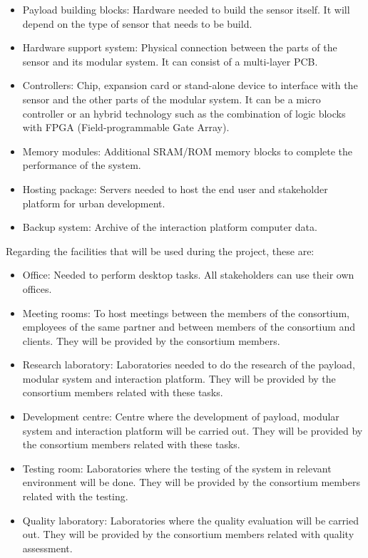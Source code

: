 \begin{itemize}
\item Payload building blocks: Hardware needed to build the sensor itself. It will depend on the type of sensor that needs to be build.
\item Hardware support system: Physical connection between the parts of the sensor and its modular system. It can consist of a multi-layer PCB.
\item Controllers: Chip, expansion card or stand-alone device to interface with the sensor and the other parts of the modular system. It can be a micro controller or an hybrid technology such as the combination of logic blocks with FPGA (Field-programmable Gate Array).
\item Memory modules: Additional SRAM/ROM memory blocks to complete the performance of the system.
\item Hosting package: Servers needed to host the end user and stakeholder platform for urban development.
\item Backup system: Archive of the interaction platform computer data. 
\end{itemize}

Regarding the facilities that will be used during the project, these are:

\begin{itemize}
\item Office: Needed to perform desktop tasks. All stakeholders can use their own offices.
\item Meeting rooms: To host meetings between the members of the consortium, employees of the same partner and between members of the consortium and clients. They will be provided by the consortium members. 
\item Research laboratory: Laboratories needed to do the research of the payload, modular system and interaction platform. They will be provided by the consortium members related with these tasks. 
\item Development centre: Centre where the development of payload, modular system and interaction platform will be carried out. They will be provided by the consortium members related with these tasks.
\item Testing room: Laboratories where the testing of the system in relevant environment will be done. They will be provided by the consortium members related with the testing.
\item Quality laboratory: Laboratories where the quality evaluation will be carried out. They will be provided by the consortium members related with quality assessment. 
\end{itemize}

